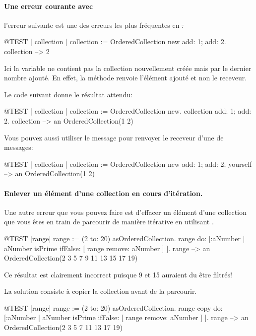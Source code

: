 \documentclass[a4paper,10pt,twoside]{book}
\begin{document}
\paragraph{Une erreur courante avec } l'erreur
suivante est une des erreurs les plus fréquentes en \st.

\begin{code}{@TEST | collection | }
collection := OrderedCollection new add: 1; add: 2.
collection --> 2
\end{code}
\noindent
Ici la variable  ne contient pas la collection nouvellement créée mais par le dernier nombre ajouté.
En effet, la méthode  renvoie l'élément ajouté et non le receveur.

Le code suivant donne le résultat attendu:
\begin{code}{@TEST | collection |}
collection := OrderedCollection new.
collection add: 1; add: 2.
collection --> an OrderedCollection(1 2)
\end{code}

Vous pouvez aussi utiliser le message  pour
renvoyer le receveur d'une  de messages:

\begin{code}{@TEST | collection |}
collection := OrderedCollection new add: 1; add: 2; yourself --> an OrderedCollection(1 2)
\end{code}

\paragraph{Enlever un élément d'une collection en cours d'itération.}
Une autre erreur que vous pouvez faire est d'effacer un élément d'une collection que vous êtes en train de parcourir de manière itérative en utilisant .
\begin{code}{@TEST |range|}
range := (2 to: 20) asOrderedCollection.
range do: [:aNumber | aNumber isPrime ifFalse: [ range remove: aNumber ] ].
range --> an OrderedCollection(2 3 5 7 9 11 13 15 17 19)
\end{code}
\noindent
Ce résultat est clairement incorrect puisque 9 et 15 auraient du être filtrés!

La solution consiste à copier la collection avant de la parcourir.
\begin{code}{@TEST |range|}
range := (2 to: 20) asOrderedCollection.
range copy do: [:aNumber | aNumber isPrime ifFalse: [ range remove: aNumber ] ].
range --> an OrderedCollection(2 3 5 7 11 13 17 19)
\end{code}
\end{document}
